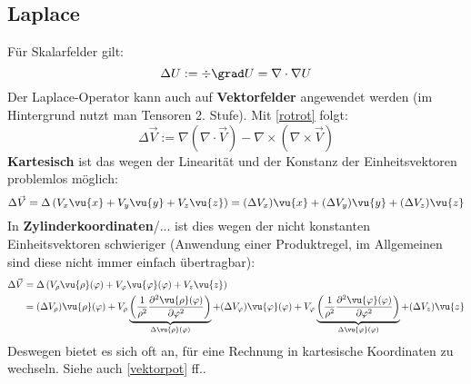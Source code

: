 	  \subsection{Laplace}\label{laplaceop}
	  Für Skalarfelder gilt:
	  \begin{equation}
\Delta U:=\div \grad U = \nabla\cdot \nabla U
	  \end{equation}
	  Der Laplace-Operator kann auch auf \textbf{Vektorfelder} angewendet werden (im Hintergrund nutzt man Tensoren 2. Stufe). Mit \ref{rotrot} folgt:
	  \begin{equation}
	  	\Delta \vec{V}:=\nabla(\nabla\cdot\vec{V})-\nabla\times(\nabla\times\vec{V})
	  \end{equation}
	   \textbf{Kartesisch} ist das wegen der Linearität und der Konstanz der Einheitsvektoren problemlos möglich:
	  \begin{equation}
	  	\Delta \vec{V}=\Delta\left(V_x\vu{x}+V_y\vu{y}+V_z\vu{z}\right)=(\Delta V_x)\vu{x}+(\Delta V_y)\vu{y}+(\Delta V_z)\vu{z}
	  \end{equation}
	  In \textbf{Zylinderkoordinaten}/... ist dies wegen der nicht konstanten Einheitsvektoren schwieriger (Anwendung einer Produktregel, im Allgemeinen sind diese nicht immer einfach übertragbar):
	  \begin{equation}
	  	\begin{split}
	\Delta \vec{V}&=\Delta\left(V_\rho\vu{\rho}(\varphi)+V_\varphi\vu{\varphi}(\varphi)+V_z\vu{z}\right)\\&=(\Delta V_\rho)\vu{\rho}(\varphi)+V_\rho\underbrace{\left(\frac{1}{\rho^2}\frac{\partial^2\vu{\rho}(\varphi)}{\partial \varphi^2}\right)}_{\Delta\vu{\rho}(\varphi)}+(\Delta V_\varphi)\vu{\varphi}(\varphi)+V_\varphi\underbrace{\left(\frac{1}{\rho^2}\frac{\partial^2\vu{\varphi}(\varphi)}{\partial \varphi^2}\right)}_{\Delta\vu{\varphi}(\varphi)}+(\Delta V_z)\vu{z}
	\end{split}
	  \end{equation}
	  Deswegen bietet es sich oft an, für eine Rechnung in kartesische Koordinaten zu wechseln. Siehe auch \ref{vektorpot} ff..
